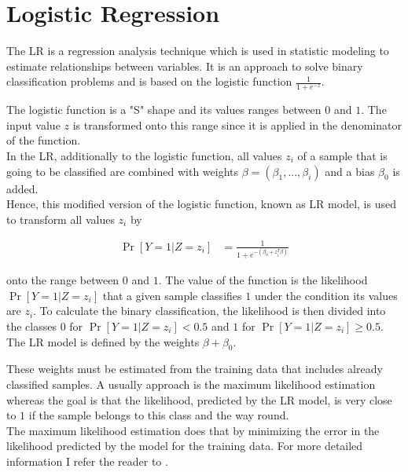 \section{Logistic Regression}
\label{sec:lr}

The \acf{LR} is a regression analysis technique which is used in statistic modeling to estimate relationships between variables. %
It is an approach to solve binary classification problems and is based on the logistic function $\frac{1}{1 + e^{-z}}$.

The logistic function is a "S" shape and its values ranges between $0$ and $1$.
The input value $z$ is transformed onto this range since it is applied in the denominator of the function.\\
In the \ac{LR}, additionally to the logistic function, all values $z_i$ of a sample that is going to be classified are combined with weights $\beta =(\beta_1, ..., \beta_i)$ and a bias $\beta_0$ is added.\\
Hence, this modified version of the logistic function, known as \ac{LR} model, is used to transform all values $z_i$ by 

\begin{align*}
\Pr[Y = 1 | Z = z_i] &= \frac{1}{1 + e^{-(\beta_0 + z^T_i \beta)}}
\end{align*}

onto the range between $0$ and $1$.
The value of the function is the likelihood $\Pr[Y = 1 | Z = z_i]$ that a given sample classifies $1$ under the condition its values are $z_i$.
To calculate the binary classification, the likelihood is then divided into the classes $0$ for $\Pr[Y = 1 | Z = z_i] < 0.5$ and $1$ for $\Pr[Y = 1 | Z = z_i] \ge 0.5$.\\
The \ac{LR} model is defined by the weights $\beta + \beta_0$. %

These weights must be estimated from the training data that includes already classified samples.
A usually approach is the maximum likelihood estimation whereas the goal is that the likelihood, predicted by the \ac{LR} model, is very close to $1$ if the sample belongs to this class and the way round.\\
The maximum likelihood estimation does that by minimizing the error in the likelihood predicted by the model for the training data. %
For more detailed information I refer the reader to \cite{2017MaximumEstimation}.

